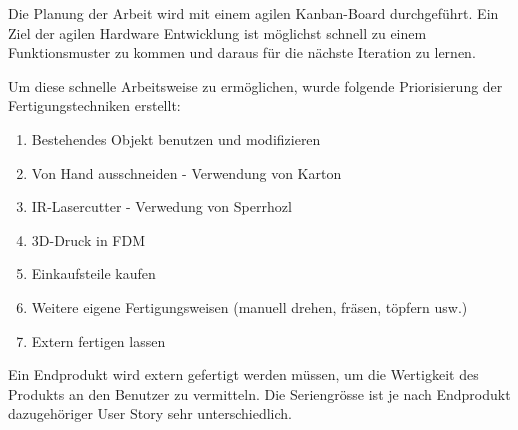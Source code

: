

Die Planung der Arbeit wird mit einem agilen Kanban-Board durchgeführt. Ein Ziel der agilen Hardware Entwicklung ist möglichst schnell zu einem Funktionsmuster zu kommen und daraus für die nächste Iteration zu lernen.

Um diese schnelle Arbeitsweise zu ermöglichen, wurde folgende Priorisierung der Fertigungstechniken erstellt:

\begin{enumerate}
\item Bestehendes Objekt benutzen und modifizieren
\item Von Hand ausschneiden - Verwendung von Karton
\item IR-Lasercutter - Verwedung von Sperrhozl
\item 3D-Druck in FDM
\item Einkaufsteile kaufen
\item Weitere eigene Fertigungsweisen (manuell drehen, fräsen, töpfern usw.)
\item Extern fertigen lassen
\end{enumerate}

Ein Endprodukt wird extern gefertigt werden müssen, um die Wertigkeit des Produkts an den Benutzer zu vermitteln. Die Seriengrösse ist je nach Endprodukt dazugehöriger User Story sehr unterschiedlich.
